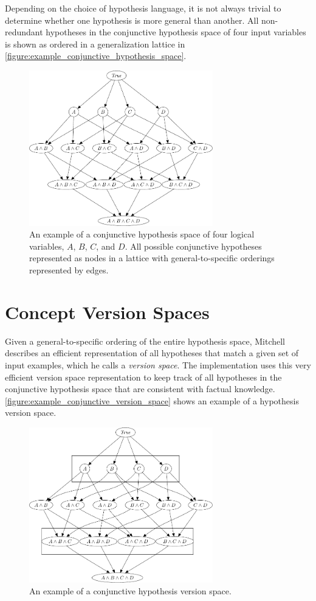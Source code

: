 Depending on the choice of hypothesis language, it is not always
trivial to determine whether one hypothesis is more general than
another.  All non-redundant hypotheses in the conjunctive hypothesis
space of four input variables is shown as ordered in a generalization
lattice in
{\mbox{\autoref{figure:example_conjunctive_hypothesis_space}}}.
\begin{figure}
\center
\includegraphics[width=8cm]{gfx/example_conjunctive_hypothesis_space}
\caption[An example of a conjunctive hypothesis space.]{An example of
  a conjunctive hypothesis space of four logical variables, $A$, $B$,
  $C$, and $D$.  All possible conjunctive hypotheses represented as
  nodes in a lattice with general-to-specific orderings represented by
  edges.}
\label{figure:example_conjunctive_hypothesis_space}
\end{figure}

\section{Concept Version Spaces}

Given a general-to-specific ordering of the entire hypothesis space,
Mitchell describes an efficient representation of all hypotheses that
match a given set of input examples, which he calls a \emph{version
  space}.  The implementation uses this very efficient version space
representation to keep track of all hypotheses in the conjunctive
hypothesis space that are consistent with factual knowledge.
{\mbox{\autoref{figure:example_conjunctive_version_space}}} shows an
example of a hypothesis version space.
\begin{figure}
\center
\includegraphics[width=8cm]{gfx/example_conjunctive_version_space}
\caption[An example of a conjunctive hypothesis version space.]{An
  example of a conjunctive hypothesis version space.}
\label{figure:example_conjunctive_hypothesis_space}
\end{figure}



